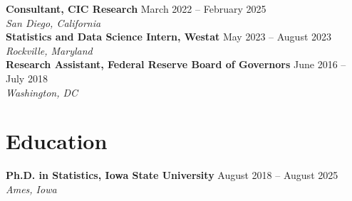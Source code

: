 \documentclass[11pt]{article}
\newcommand{\entry}[3]{%
  \noindent\textbf{#1} \hfill #3\\
  \textit{#2}\\[4pt]
}
\begin{document}
\entry{Consultant, CIC Research}{San Diego, California}{March 2022 -- February 2025}

\entry{Statistics and Data Science Intern, Westat}{Rockville, Maryland}{May 2023 -- August 2023}

\entry{Research Assistant, Federal Reserve Board of Governors}{Washington, DC}{June 2016 -- July 2018}

\section*{Education}
\entry{Ph.D. in Statistics, Iowa State University}{Ames, Iowa}{August 2018 -- August 2025}
\end{document}
